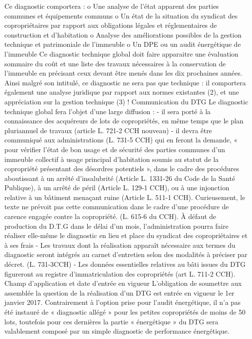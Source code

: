 		Ce diagnostic comportera :
		o Une analyse de l’état apparent des parties communes et équipements communs
		o Un état de la situation du syndicat des copropriétaires par rapport aux obligations légales et réglementaires de construction et d’habitation
		o Analyse des améliorations possibles de la gestion technique et patrimoniale de l’immeuble
		o Un DPE ou un audit énergétique de l’immeuble
		Ce diagnostic technique global doit faire apparaitre une évaluation sommaire du coût et une liste des travaux nécessaires à la conservation de l’immeuble en précisant ceux devant être menés dans les dix prochaines années.
		Ainsi malgré son intitulé, ce diagnostic ne sera pas que technique : il comportera également une analyse juridique par rapport aux normes existantes (2), et une appréciation sur la gestion technique (3) !
		Communication du DTG
		Le diagnostic technique global fera l’objet d’une large diffusion :
		- il sera porté à la connaissance des acquéreurs de lots de copropriétés, en même temps que le plan pluriannuel de travaux (article L. 721-2 CCH nouveau)
		- il devra être communiqué aux administrations (L. 731-5 CCH) qui en feront la demande, « pour vérifier l'état de bon usage et de sécurité des parties communes d'un immeuble collectif à usage principal d'habitation soumis au statut de la copropriété présentant des désordres potentiels », dans le cadre des procédures aboutissant à un arrêté d’insalubrité (Article L. 1331-26 du Code de la Santé Publique), à un arrêté de péril (Article L. 129-1 CCH), ou à une injonction relative à un bâtiment menaçant ruine (Article L. 511-1 CCH). Curieusement, le texte ne prévoit pas cette communication dans le cadre d’une procédure de carence engagée contre la copropriété. (L. 615-6 du CCH). À défaut de production du D.T.G dans le délai d’un mois, l’administration pourra faire réaliser elle-même le diagnostic en lieu et place du syndicat des copropriétaires et à ses frais
		- Les travaux dont la réalisation apparaît nécessaire aux termes du diagnostic seront intégrés au carnet d'entretien selon des modalités à préciser par décret. (L. 731-3CCH)
		- Les données essentielles relatives au bâti issues du DTG figureront au registre d’immatriculation des copropriétés (art L. 711-2 CCH).
		Champ d’application et date d’entrée en vigueur
		L’obligation de soumettre aux assemblée la question de la réalisation d’un DTG est entrée en vigueur le 1er janvier 2017.
		Contrairement à l’option prise pour l’audit énergétique, il n’a pas été instauré de « diagnostic allégé » pour les petites copropriétés de moins de 50 lots, toutefois pour ces dernières la partie « énergétique » du DTG sera valablement composé par un simple diagnostic de performance énergétique.
